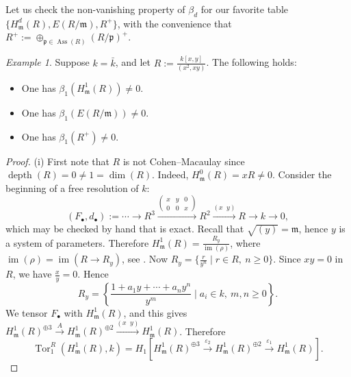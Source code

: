 \documentclass[11pt,a4paper]{amsart}
\numberwithin{equation}{section}
\theoremstyle{definition}
\theoremstyle{remark}
\newtheorem{example}[theorem]{Example}
\newcommand{\Ass}{\operatorname{Ass}}
\newcommand{\lo}{\longrightarrow}
\newcommand{\fp}{\mathfrak{p}}
\begin{document}
Let us check the non-vanishing property of $\beta_d$
for our favorite table $\{H^d_{\mathfrak{m}}(R),E(R/\mathfrak{m}), R^+\}$, with the convenience that
$R^+:=\oplus_{\fp\in\Ass(R)} (R/\fp)^+$.
\begin{example}
 Suppose $k=\bar{k}$, and let \(R:=\frac{k[x,y]}{(x^2,xy)}\). The following holds:
\begin{itemize}
\item[(i)] 
One has 	\(\beta_1(H^1_{\mathfrak{m}}(R))\neq 0\).
\item[(ii)] One has 
\(\beta_1(E(R/\mathfrak{m}))\neq 0\).
\item[(iii)] One has 		\(\beta_1(R^+)\neq 0\).
	\end{itemize}
\end{example}

\begin{proof}
(i)	First note that \(R\) is not Cohen--Macaulay since \(\operatorname{depth}(R)=0\neq 1=\dim(R)\). Indeed, \(H^0_{\mathfrak{m}}(R)=xR\neq 0\). Consider the beginning of a free resolution of \(k\):
	\[
(F_\bullet,d_\bullet):=	\cdots\lo R^3 \xrightarrow{\begin{pmatrix}x&y&0\\0&0&x\end{pmatrix}} R^2 \xrightarrow{(x\;\;y)} R \longrightarrow k \longrightarrow 0,
	\]which may be checked by hand that is exact.
Recall that \(\sqrt{(y)}=\mathfrak{m}\), hence \(y\) is a system of parameters. Therefore \(H^1_{\mathfrak{m}}(R) = \frac{R_y}{\operatorname{im}(\rho)}\), where \(\operatorname{im}(\rho)=\operatorname{im}(R\to R_y)\), see \cite[Corollary 2.2.21]{BSh}. Now \(R_y = \{\frac{r}{y^n}\mid r\in R,\ n\ge 0\}\). Since \(xy=0\) in \(R\), we have \(\frac{x}{y}=0\). Hence
\[R_y = \left\{\frac{1+a_1y+\cdots+a_ny^n}{y^m}\mid a_i\in k,\ m,n\ge 0\right\}.
	\]	
We tensor  $F_\bullet$ with \(H^1_{\mathfrak{m}}(R)\), and this  gives \(  H^1_{\mathfrak{m}}(R) ^{\oplus 3} \xrightarrow{A}  H^1_{\mathfrak{m}}(R) ^{\oplus 2} \xrightarrow{(x\;\;y)} H^1_{\mathfrak{m}}(R)\). Therefore
\[
\operatorname{Tor}_1^R(H^1_{\mathfrak{m}}(R),k) = H_1[ H^1_{\mathfrak{m}}(R) ^{\oplus 3} \stackrel{\varepsilon_2}\lo  H^1_{\mathfrak{m}}(R) ^{\oplus 2} \stackrel{ \varepsilon_1}\lo H^1_{\mathfrak{m}}(R)].
\]
	

\end{proof}
\end{document}
